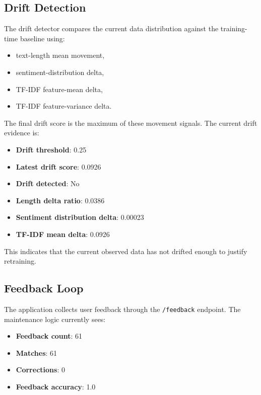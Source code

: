 \documentclass[11pt,a4paper]{article}
\newcommand{\smallmetric}[2]{\textbf{#1}: #2}
\begin{document}
\subsection{Drift Detection}

The drift detector compares the current data distribution against the training-time baseline using:

\begin{itemize}[leftmargin=1.4em]
  \item text-length mean movement,
  \item sentiment-distribution delta,
  \item TF-IDF feature-mean delta,
  \item TF-IDF feature-variance delta.
\end{itemize}

The final drift score is the maximum of these movement signals. The current drift evidence is:

\begin{itemize}[leftmargin=1.4em]
  \item \smallmetric{Drift threshold}{0.25}
  \item \smallmetric{Latest drift score}{0.0926}
  \item \smallmetric{Drift detected}{No}
  \item \smallmetric{Length delta ratio}{0.0386}
  \item \smallmetric{Sentiment distribution delta}{0.00023}
  \item \smallmetric{TF-IDF mean delta}{0.0926}
\end{itemize}

This indicates that the current observed data has not drifted enough to justify retraining.

\subsection{Feedback Loop}

The application collects user feedback through the \texttt{/feedback} endpoint. The maintenance logic currently sees:

\begin{itemize}[leftmargin=1.4em]
  \item \smallmetric{Feedback count}{61}
  \item \smallmetric{Matches}{61}
  \item \smallmetric{Corrections}{0}
  \item \smallmetric{Feedback accuracy}{1.0}
\end{itemize}
\end{document}
